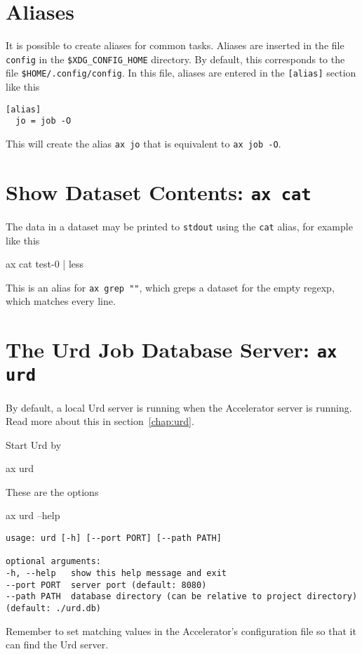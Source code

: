 \section{Aliases}
It is possible to create aliases for common tasks.  Aliases are
inserted in the file \texttt{config} in the \texttt{\$XDG\_CONFIG\_HOME}
directory.  By default, this corresponds to the file \texttt{\$HOME/.config/config}.
In this file, aliases are entered in the \texttt{[alias]} section like this
\begin{verbatim}
[alias]
  jo = job -O
\end{verbatim}
This will create the alias \texttt{ax jo} that is equivalent to
\texttt{ax job -O}.



\section{Show Dataset Contents: \texttt{ax cat}}
The data in a dataset may be printed to \texttt{stdout} using the
\texttt{cat} alias, for example like this
\begin{shell}
ax cat test-0 | less
\end{shell}
This is an alias for \texttt{ax grep ""}, which greps a dataset for the
empty regexp, which matches every line.





\section{The Urd Job Database Server: \texttt{ax urd}}
By default, a local Urd server is running when the Accelerator server
is running.  Read more about this in section~\ref{chap:urd}.

Start Urd by
\begin{shell}
ax urd
\end{shell}
These are the options
\begin{shell}
ax urd --help
\end{shell}
\begin{snugshade}
\begin{verbatim}
usage: urd [-h] [--port PORT] [--path PATH]

optional arguments:
-h, --help   show this help message and exit
--port PORT  server port (default: 8080)
--path PATH  database directory (can be relative to project directory)
(default: ./urd.db)
\end{verbatim}
\end{snugshade}
Remember to set matching values in the Accelerator's configuration
file so that it can find the Urd server.


